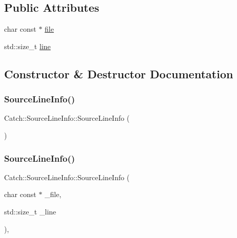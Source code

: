 \subsection*{Public Attributes}
\begin{DoxyCompactItemize}
\item 
char const  $\ast$ \mbox{\hyperlink{struct_catch_1_1_source_line_info_ad65537703e9f08c1fa7777fbc3f0c617}{file}}
\item 
std\+::size\+\_\+t \mbox{\hyperlink{struct_catch_1_1_source_line_info_a841e5d696c7b9cde24e45e61dd979c77}{line}}
\end{DoxyCompactItemize}


\subsection{Constructor \& Destructor Documentation}
\mbox{\label{struct_catch_1_1_source_line_info_a2d80932bb4129b1606d1924a5c44be2f}} 
\subsubsection{\texorpdfstring{SourceLineInfo()}{SourceLineInfo()}\hspace{0.1cm}{\footnotesize\ttfamily [1/4]}}
{\footnotesize\ttfamily Catch\+::\+Source\+Line\+Info\+::\+Source\+Line\+Info (\begin{DoxyParamCaption}{ }\end{DoxyParamCaption})\hspace{0.3cm}{\ttfamily [delete]}}

\mbox{\label{struct_catch_1_1_source_line_info_a48510b82a39a042ab370ed143dd30c10}} 
\subsubsection{\texorpdfstring{SourceLineInfo()}{SourceLineInfo()}\hspace{0.1cm}{\footnotesize\ttfamily [2/4]}}
{\footnotesize\ttfamily Catch\+::\+Source\+Line\+Info\+::\+Source\+Line\+Info (\begin{DoxyParamCaption}\item[{char const $\ast$}]{\+\_\+file,  }\item[{std\+::size\+\_\+t}]{\+\_\+line }\end{DoxyParamCaption})\hspace{0.3cm}{\ttfamily [inline]}, {\ttfamily [noexcept]}}

